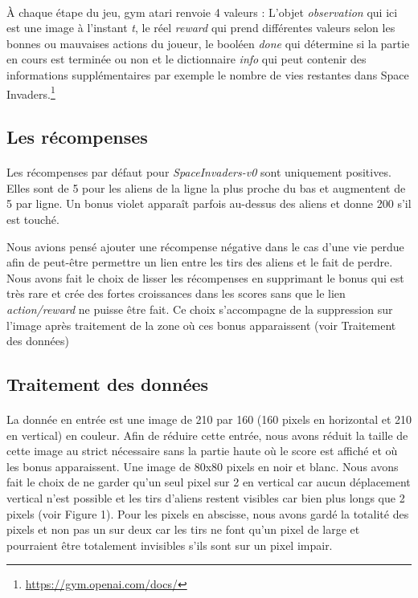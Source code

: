 \documentclass[12pt,oneside,a4paper]{article}
\begin{document}
    \paragraph{}
    À chaque étape du jeu, gym atari renvoie 4 valeurs :
    L'objet \textit{observation} qui ici est une image à l'instant \textit{t}, le réel \textit{reward} qui
    prend différentes valeurs selon les bonnes ou mauvaises actions du joueur,
    le booléen \textit{done} qui détermine si la partie en cours est terminée ou non et
    le dictionnaire \textit{info} qui peut contenir des informations supplémentaires
    par exemple le nombre de vies restantes dans Space Invaders.\footnote{\url{https://gym.openai.com/docs/}}

    \subsection{Les récompenses}

    \paragraph{}
    Les récompenses par défaut pour \textit{SpaceInvaders-v0} sont uniquement positives.
    Elles sont de 5 pour les aliens de la ligne la plus proche du bas et augmentent de 5 par ligne.
    Un bonus violet apparaît parfois au-dessus des aliens et donne 200 s'il est touché.

    Nous avions pensé ajouter une récompense négative dans le cas d'une vie perdue afin de peut-être
    permettre un lien entre les tirs des aliens et le fait de perdre. Nous avons fait le choix de lisser les
    récompenses en supprimant le bonus qui est très rare et crée des fortes croissances dans les scores sans que
    le lien \textit{action/reward} ne puisse être fait. Ce choix s'accompagne de la suppression sur l'image
    après traitement de la zone où ces bonus apparaissent (voir Traitement des données)

    \newpage

    \subsection{Traitement des données}

    \paragraph{}
    La donnée en entrée est une image de 210 par 160 (160 pixels en horizontal et 210 en vertical)
    en couleur. Afin de réduire cette entrée, nous avons réduit la taille de cette image au strict nécessaire sans la
    partie haute où le score est affiché et où les bonus apparaissent.
    Une image de 80x80 pixels en noir et blanc. Nous avons fait le choix
    de ne garder qu'un seul pixel sur 2 en vertical car aucun déplacement vertical n'est possible et
    les tirs d'aliens restent visibles car bien plus longs que 2 pixels (voir Figure 1). Pour les pixels en abscisse,
    nous avons gardé la totalité des pixels et non pas un sur deux car les tirs
    ne font qu'un pixel de large et pourraient être totalement invisibles s'ils sont sur un pixel impair.
\end{document}
